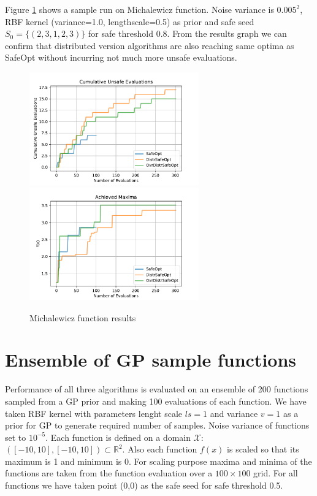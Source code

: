 Figure \ref{fig:michalewicz-result} shows a sample run on Michalewicz function. Noise variance is $0.005^2$, RBF kernel (variance=1.0, lengthscale=0.5) as prior and safe seed $S_0=\{ (2, 3, 1, 2, 3) \}$ for safe threshold 0.8. From the results graph we can confirm that distributed version algorithms are also reaching same optima as SafeOpt without incurring not much more unsafe evaluations.
\begin{figure}[H]
	\centering
	\includegraphics[width=0.65\textwidth]{figures/results/michalewicz-cum-unsafe.pdf}
	\includegraphics[width=0.65\textwidth]{figures/results/michalewicz-maxima.pdf}
	\caption{Michalewicz function results}
	\label{fig:michalewicz-result}
\end{figure}


\section{Ensemble of GP sample functions}\label{sec:ensemble}
Performance of all three algorithms is evaluated on an ensemble of 200 functions sampled from a GP prior and making 100 evaluations of each function. We have taken RBF kernel with parameters lenght scale $ls=1$ and variance $v=1$ as a prior for GP to generate required number of samples. Noise variance of functions set to $10^{-5}$.
Each function is defined on a domain $\mathcal{X}$: $([-10, 10], [-10, 10]) \subset \mathbb{R}^2$. Also each function $f(x)$ is scaled so that its maximum is 1 and minimum is 0. For scaling purpose maxima and minima of the functions are taken from the function evaluation over a $100\times100$ grid. For all functions we have taken point (0,0) as the safe seed for safe threshold 0.5. 

